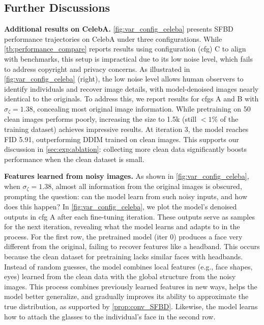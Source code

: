 \subsection{Further Discussions}

\label{sec:exp:futher_discuss}
\textbf{Additional results on CelebA.} \cref{fig:var_config_celeba} presents SFBD performance trajectories on CelebA under three configurations. While \cref{tb:performance_compare} reports results using configuration (cfg) C to align with benchmarks, this setup is impractical due to its low noise level, which fails to address copyright and privacy concerns. As illustrated in \cref{fig:var_config_celeba} (right), the low noise level allows human observers to identify individuals and recover image details, with model-denoised images nearly identical to the originals. To address this, we report results for cfgs A and B with $\sigma_\zeta = 1.38$, concealing most original image information. While pretraining on 50 clean images performs poorly, increasing the size to 1.5k (still $< 1\%$ of the training dataset) achieves impressive results. At iteration 3, the model reaches FID 5.91, outperforming DDIM trained on clean images. This supports our discussion in \cref{sec:exp:ablation}: collecting more clean data significantly boosts performance when the clean dataset is small.

\textbf{Features learned from noisy images.} As shown in \cref{fig:var_config_celeba}, when $\sigma_\zeta = 1.38$, almost all information from the original images is obscured, prompting the question: can the model learn from such noisy inputs, and how does this happen? In \cref{fig:var_config_celeba}, we plot the model’s denoised outputs in cfg A after each fine-tuning iteration. These outputs serve as samples for the next iteration, revealing what the model learns and adapts to in the process. For the first row, the pretrained model (iter 0) produces a face very different from the original, failing to recover features like a headband. This occurs because the clean dataset for pretraining lacks similar faces with headbands. Instead of random guesses, the model combines local features (e.g., face shapes, eyes) learned from the clean data with the global structure from the noisy images. This process combines previously learned features in new ways, helps the model better generalize, and gradually improves its ability to approximate the true distribution, as supported by \cref{prop:conv_SFBD}. Likewise, the model learns how to attach the glasses to the individual's face in the second row. 
